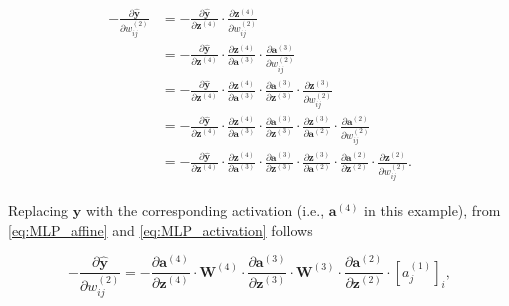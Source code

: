 \begin{align}\label{eq:backprop_step2}
\begin{split}
    -\frac{\partial\mathbf{\hat y}}{\partial w_{ij}^{(2)}} &=
        -\frac{\partial \mathbf{\hat y}}{\partial \mathbf{z}^{(4)}} \cdot
        \frac{\partial \mathbf{z}^{(4)}}{\partial w_{ij}^{(2)}} \\
    &= -\frac{\partial \mathbf{\hat y}} {\partial \mathbf{z}^{(4)}} \cdot
        \frac{\partial \mathbf{z}^{(4)}}{\partial \mathbf{a}^{(3)}} \cdot
        \frac{\partial \mathbf{a}^{(3)}}{\partial w_{ij}^{(2)}} \\
    &= -\frac{\partial \mathbf{\hat y}} {\partial \mathbf{z}^{(4)}} \cdot
        \frac{\partial \mathbf{z}^{(4)}}{\partial \mathbf{a}^{(3)}} \cdot
        \frac{\partial \mathbf{a}^{(3)}}{\partial \mathbf{z}^{(3)}} \cdot
        \frac{\partial \mathbf{z}^{(3)}}{\partial w_{ij}^{(2)}} \\
    &= -\frac{\partial \mathbf{\hat y}} {\partial \mathbf{z}^{(4)}} \cdot
        \frac{\partial \mathbf{z}^{(4)}}{\partial \mathbf{a}^{(3)}} \cdot
        \frac{\partial \mathbf{a}^{(3)}}{\partial \mathbf{z}^{(3)}} \cdot
        \frac{\partial \mathbf{z}^{(3)}}{\partial \mathbf{a}^{(2)}} \cdot
        \frac{\partial \mathbf{a}^{(2)}}{\partial w_{ij}^{(2)}} \\
    &= -\frac{\partial \mathbf{\hat y}} {\partial \mathbf{z}^{(4)}} \cdot
        \frac{\partial \mathbf{z}^{(4)}}{\partial \mathbf{a}^{(3)}} \cdot
        \frac{\partial \mathbf{a}^{(3)}}{\partial \mathbf{z}^{(3)}} \cdot
        \frac{\partial \mathbf{z}^{(3)}}{\partial \mathbf{a}^{(2)}} \cdot
        \frac{\partial \mathbf{a}^{(2)}}{\partial \mathbf{z}^{(2)}} \cdot
        \frac{\partial \mathbf{z}^{(2)}}{\partial w_{ij}^{(2)}}.
\end{split}
\end{align}

Replacing $\mathbf{\hat y}$ with the corresponding activation
(i.e., $\mathbf{a}^{(4)}$ in this example), from \autoref{eq:MLP_affine} and
\autoref{eq:MLP_activation} follows

\begin{equation}\label{eq:backprop_step3}
    -\frac{\partial\mathbf{\hat y}}{\partial w_{ij}^{(2)}} =
       -\frac{\partial \mathbf{a}^{(4)}} {\partial \mathbf{z}^{(4)}} \cdot
        \mathbf{W}^{(4)} \cdot
        \frac{\partial \mathbf{a}^{(3)}}{\partial \mathbf{z}^{(3)}} \cdot
        \mathbf{W}^{(3)} \cdot
        \frac{\partial \mathbf{a}^{(2)}}{\partial \mathbf{z}^{(2)}} \cdot
        [a_{j}^{(1)}]_i,
\end{equation}


